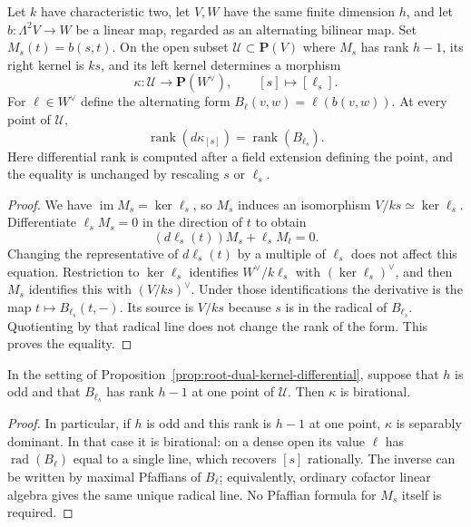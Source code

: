 \begin{proposition}
\label{prop:root-dual-kernel-differential}
Let $k$ have characteristic two, let $V,W$ have the same finite dimension
$h$, and let $b:\Lambda^2V\to W$ be a linear map, regarded as an
alternating bilinear map. Set $M_s(t)=b(s,t)$. On the open subset
$\mathcal U\subset\mathbf P(V)$ where $M_s$ has rank $h-1$, its right
kernel is $ks$, and its left kernel determines a morphism
\[
 \kappa:\mathcal U\longrightarrow\mathbf P(W^\vee),
 \qquad [s]\longmapsto[\ell_s].
\]
For $\ell\in W^\vee$ define the alternating form
$B_\ell(v,w)=\ell(b(v,w))$. At every point of $\mathcal U$,
\[
             \operatorname{rank}(d\kappa_{[s]})
                      =\operatorname{rank}(B_{\ell_s}).
\]
Here differential rank is computed after a field extension defining the
point, and the equality is unchanged by rescaling $s$ or $\ell_s$.
\end{proposition}
\begin{proof}
We have $\operatorname{im}M_s=\ker\ell_s$, so $M_s$
induces an isomorphism $V/ks\simeq\ker\ell_s$. Differentiate
$\ell_sM_s=0$ in the direction of $t$ to obtain
\[
             (d\ell_s(t))M_s+\ell_sM_t=0.
\]
Changing the representative of $d\ell_s(t)$ by a multiple of $\ell_s$
does not affect this equation. Restriction to $\ker\ell_s$ identifies
$W^\vee/k\ell_s$ with $(\ker\ell_s)^\vee$, and then $M_s$ identifies
this with $(V/ks)^\vee$. Under those identifications the derivative is
the map $t\mapsto B_{\ell_s}(t,-)$. Its source is $V/ks$ because
$s$ is in the radical of $B_{\ell_s}$. Quotienting by that radical
line does not change the rank of the form. This proves the equality.
\end{proof}
\begin{corollary}
\label{cor:root-dual-kernel-birational}
In the setting of Proposition~\ref{prop:root-dual-kernel-differential},
suppose that $h$ is odd and that $B_{\ell_s}$ has rank $h-1$ at one
point of $\mathcal U$. Then $\kappa$ is birational.
\end{corollary}
\begin{proof}
In particular, if $h$ is odd and this rank is $h-1$ at one point,
$\kappa$ is separably dominant. In that case it is birational: on a
dense open its value $\ell$ has $\operatorname{rad}(B_\ell)$ equal
to a single line, which recovers $[s]$ rationally. The inverse can be
written by maximal Pfaffians of $B_\ell$; equivalently, ordinary
cofactor linear algebra gives the same unique radical line. No
Pfaffian formula for $M_s$ itself is required.
\end{proof}
